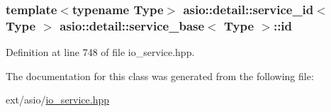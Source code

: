 \subsubsection[{id}]{\setlength{\rightskip}{0pt plus 5cm}template$<$typename Type$>$ {\bf asio\+::detail\+::service\+\_\+id}$<$ Type $>$ {\bf asio\+::detail\+::service\+\_\+base}$<$ Type $>$\+::id\hspace{0.3cm}{\ttfamily [static]}}\label{classasio_1_1detail_1_1service__base_a4df341e7693a761a9b83a79ae9b8cd4e}


Definition at line 748 of file io\+\_\+service.\+hpp.



The documentation for this class was generated from the following file\+:\begin{DoxyCompactItemize}
\item 
ext/asio/\hyperlink{io__service_8hpp}{io\+\_\+service.\+hpp}\end{DoxyCompactItemize}
